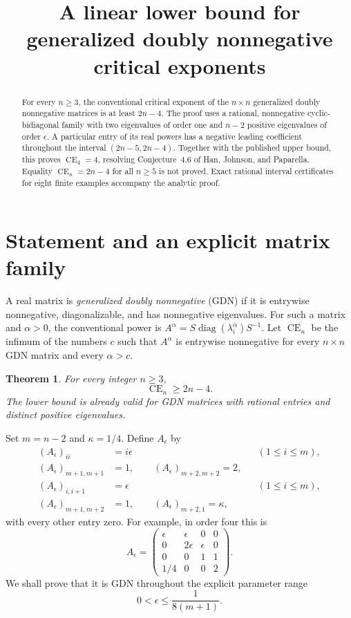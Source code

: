 \documentclass[11pt]{article}
\title{A linear lower bound for generalized doubly nonnegative critical exponents}
\author{}
\date{}
\newtheorem{theorem}{Theorem}
\newcommand{\CE}{\operatorname{CE}}
\newcommand{\diag}{\operatorname{diag}}
\begin{document}
\maketitle
\begin{abstract}
For every $n\ge3$, the conventional critical exponent of the $n\times n$ generalized doubly nonnegative matrices is at least $2n-4$. The proof uses a rational, nonnegative cyclic-bidiagonal family with two eigenvalues of order one and $n-2$ positive eigenvalues of order $\epsilon$. A particular entry of its real powers has a negative leading coefficient throughout the interval $(2n-5,2n-4)$. Together with the published upper bound, this proves $\CE_4=4$, resolving Conjecture~4.6 of Han, Johnson, and Paparella. Equality $\CE_n=2n-4$ for all $n\ge5$ is not proved. Exact rational interval certificates for eight finite examples accompany the analytic proof.
\end{abstract}

\section{Statement and an explicit matrix family}
A real matrix is \emph{generalized doubly nonnegative} (GDN) if it is entrywise nonnegative, diagonalizable, and has nonnegative eigenvalues. For such a matrix and $\alpha>0$, the conventional power is $A^\alpha=S\diag(\lambda_i^\alpha)S^{-1}$. Let $\CE_n$ be the infimum of the numbers $c$ such that $A^\alpha$ is entrywise nonnegative for every $n\times n$ GDN matrix and every $\alpha>c$.

\begin{theorem}\label{thm:lower}
For every integer $n\ge3$,
\[
\CE_n\ge 2n-4.
\]
The lower bound is already valid for GDN matrices with rational entries and distinct positive eigenvalues.
\end{theorem}

Set $m=n-2$ and $\kappa=1/4$. Define $A_\epsilon$ by
\begin{align}
(A_\epsilon)_{ii}&=i\epsilon &&(1\le i\le m),\nonumber\\
(A_\epsilon)_{m+1,m+1}&=1,\qquad (A_\epsilon)_{m+2,m+2}=2,\nonumber\\
(A_\epsilon)_{i,i+1}&=\epsilon &&(1\le i\le m),\label{eq:matrix}\\
(A_\epsilon)_{m+1,m+2}&=1,\qquad (A_\epsilon)_{m+2,1}=\kappa,\nonumber
\end{align}
with every other entry zero. For example, in order four this is
\[
A_\epsilon=\begin{pmatrix}
\epsilon&\epsilon&0&0\\
0&2\epsilon&\epsilon&0\\
0&0&1&1\\
1/4&0&0&2
\end{pmatrix}.
\]
We shall prove that it is GDN throughout the explicit parameter range
\begin{equation}\label{eq:epsrange}
0<\epsilon\le\frac{1}{8(m+1)}.
\end{equation}
\end{document}
